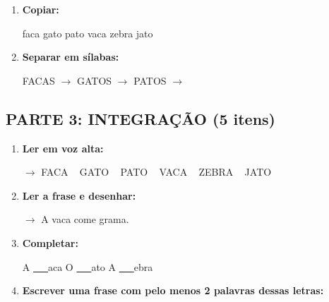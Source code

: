 \begin{exercicio}
\begin{enumerate}[resume]
  \item \textbf{Copiar:}
  \begin{center}
  faca \quad gato \quad pato \quad vaca \quad zebra \quad jato
  \end{center}

  \item \textbf{Separar em sílabas:}
  \begin{center}
  FACAS $\rightarrow$ \underline{\hspace{1cm}} \underline{\hspace{1cm}} \quad GATOS $\rightarrow$ \underline{\hspace{1cm}} \underline{\hspace{1cm}} \quad PATOS $\rightarrow$ \underline{\hspace{1cm}} \underline{\hspace{1cm}}
  \end{center}
\end{enumerate}

\subsection*{PARTE 3: INTEGRAÇÃO (5 itens)}

\begin{enumerate}[resume]
  \item \textbf{Ler em voz alta:}
  \begin{center}
  $\rightarrow$ FACA  ~  GATO  ~  PATO  ~  VACA  ~  ZEBRA  ~  JATO
  \end{center}

  \item \textbf{Ler a frase e desenhar:}
  \begin{center}
  $\rightarrow$ A vaca come grama.
  \end{center}
  \begin{center}
  \end{center}

  \item \textbf{Completar:}
  \begin{center}
  A \underline{~~~}aca \quad O \underline{~~~}ato \quad A \underline{~~~}ebra
  \end{center}

  \item \textbf{Escrever uma frase com pelo menos 2 palavras dessas letras:}
  \begin{center}
  \underline{\hspace{12cm}}
  \end{center}


\end{enumerate}
\end{exercicio}
